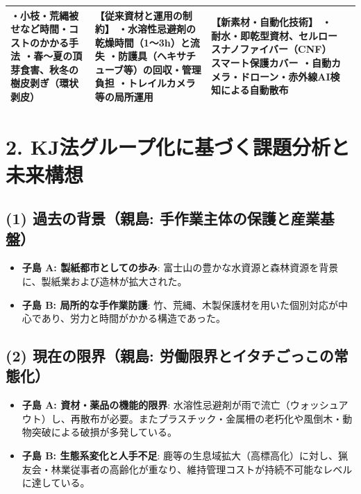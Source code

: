 \documentclass[uplatex, 11pt, a4paper]{bxjsarticle}
\begin{document}
\begin{table}[h]
\begin{tabular}{|p{2.8cm}|p{4.2cm}|p{4.2cm}|p{4.2cm}|}
・小枝・荒縄被せなど時間・コストのかかる手法\newline
・春～夏の頂芽食害、秋冬の樹皮剥ぎ（環状剥皮） & 
\textbf{【従来資材と運用の制約】}\newline
・水溶性忌避剤の乾燥時間（1～3h）と流失\newline
・防護具（ヘキサチューブ等）の回収・管理負担\newline
・トレイルカメラ等の局所運用 & 
\textbf{【新素材・自動化技術】}\newline
・耐水・即乾型資材、セルロースナノファイバー（CNF）スマート保護カバー\newline
・自動カメラ・ドローン・赤外線AI検知による自動散布 \\ \hline
\end{tabular}
\end{table}

\vspace{1em}

\section*{2. KJ法グループ化に基づく課題分析と未来構想}

\subsection*{(1) 過去の背景（親島: 手作業主体の保護と産業基盤）}
\begin{itemize}[label=--]
    \item \textbf{子島 A: 製紙都市としての歩み}: 富士山の豊かな水資源と森林資源を背景に、製紙業および造林が拡大された。
    \item \textbf{子島 B: 局所的な手作業防護}: 竹、荒縄、木製保護材を用いた個別対応が中心であり、労力と時間がかかる構造であった。
\end{itemize}

\subsection*{(2) 現在の限界（親島: 労働限界とイタチごっこの常態化）}
\begin{itemize}[label=--]
    \item \textbf{子島 A: 資材・薬品の機能的限界}: 水溶性忌避剤が雨で流亡（ウォッシュアウト）し、再散布が必要。またプラスチック・金属柵の老朽化や風倒木・動物突破による破損が多発している。
    \item \textbf{子島 B: 生態系変化と人手不足}: 鹿等の生息域拡大（高標高化）に対し、猟友会・林業従事者の高齢化が重なり、維持管理コストが持続不可能なレベルに達している。
\end{itemize}
\end{document}

